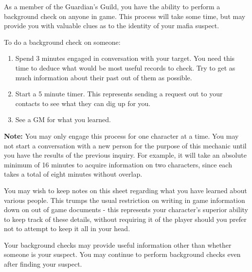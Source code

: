 \documentclass[green]{NeptuneBall}
\begin{document}
\name{\gBackground{}}

As a member of the Guardian's Guild, you have the ability to perform a background check on anyone in game. This process will take some time, but may provide you with valuable clues as to the identity of your mafia suspect.

To do a background check on someone:
\begin{enumerate}
\item Spend 3 minutes engaged in conversation with your target. You need this time to deduce what would be most useful records to check. Try to get as much information about their past out of them as possible.
\item Start a 5 minute timer. This represents sending a request out to your contacts to see what they can dig up for you.
\item See a GM for what you learned.
\end{enumerate}

\textbf{Note:} You may only engage this process for one character at a time. You may not start a conversation with a new person for the purpose of this mechanic until you have the results of the previous inquiry. For example, it will take an absolute minimum of 16 minutes to acquire information on two characters, since each takes a total of eight minutes without overlap.

You may wish to keep notes on this sheet regarding what you have learned about various people. This trumps the usual restriction on writing in game information down on out of game documents - this represents your character's superior ability to keep track of these details, without requiring it of the player should you prefer not to attempt to keep it all in your head.

Your background checks may provide useful information other than whether someone is your suspect.  You may continue to perform background checks even after finding your suspect.
\end{document}

